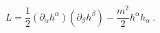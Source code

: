 \begin{equation}
L=\frac{1}{2}\left( \partial _{\alpha }h^{\alpha }\right) \left( \partial
_{\beta }h^{\beta }\right) -\frac{m^{2}}{2}h^{\alpha }h_{\alpha }\ .
\end{equation}%
